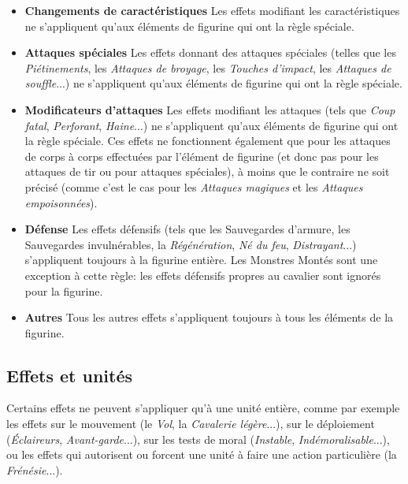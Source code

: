 \begin{itemize}
\item \textbf{Changements de caractéristiques}
\newline Les effets modifiant les caractéristiques ne s'appliquent qu'aux éléments de figurine qui ont la règle spéciale.
\item \textbf{Attaques spéciales}
\newline Les effets donnant des attaques spéciales (telles que les \emph{Piétinements}, les \emph{Attaques de broyage}, les \emph{Touches d'impact}, les \emph{Attaques de souffle}...) ne s'appliquent qu'aux éléments de figurine qui ont la règle spéciale.
\item \textbf{Modificateurs d'attaques}
\newline Les effets modifiant les attaques (tels que \emph{Coup fatal}, \emph{Perforant}, \emph{Haine}...) ne s'appliquent qu'aux éléments de figurine qui ont la règle spéciale. Ces effets ne fonctionnent également que pour les attaques de corps à corps effectuées par l'élément de figurine (et donc pas pour les attaques de tir ou pour attaques spéciales), à moins que le contraire ne soit précisé (comme c'est le cas pour les \emph{Attaques magiques} et les \emph{Attaques empoisonnées}).
\item \textbf{Défense}
\newline Les effets défensifs (tels que les Sauvegardes d'armure, les Sauvegardes invulnérables, la \emph{Régénération}, \emph{Né du feu}, \emph{Distrayant}...) s'appliquent toujours à la figurine entière.
\newline Les Monstres Montés sont une exception à cette règle: les effets défensifs propres au cavalier sont ignorés pour la figurine.
\item \textbf{Autres}
\newline Tous les autres effets s'appliquent toujours à tous les éléments de la figurine.
\end{itemize}

\subsection{Effets et unités}

Certains effets ne peuvent s'appliquer qu'à une unité entière, comme par exemple les effets sur le mouvement (le \emph{Vol}, la \emph{Cavalerie légère}...), sur le déploiement (\emph{Éclaireurs}, \emph{Avant-garde}...), sur les tests de moral (\emph{Instable}, \emph{Indémoralisable}...), ou les effets qui autorisent ou forcent une unité à faire une action particulière (la \emph{Frénésie}...).

